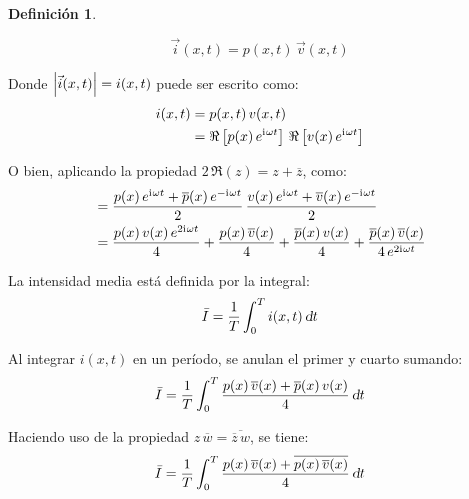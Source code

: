 \documentclass[a5paper,12pt,twoside]{book}
\newtheorem{defn}{{Definición}}[chapter]
\begin{document}

\begin{mdframed}[style=MyFrame1]
    \begin{defn}
    \end{defn}
    \begin{equation*}
        \Vec{i}(x,t) = p(x,t) \, \Vec{v}(x,t)
    \end{equation*}
\end{mdframed}


Donde ${\left| {\Vec{i}(x,t)} \right|}=i(x,t)$ puede ser escrito como:
\begin{align*}
    i(x,t) &= p(x,t) \, v(x,t)
    \\
    &= \Re \left[ p(x) \, e^{\mathrm{i}\mkern1mu \omega t} \right] \, \Re \left[ v(x) \, e^{\mathrm{i}\mkern1mu \omega t} \right]
\end{align*}

O bien, aplicando la propiedad $2\,\Re(z)=z+\overline{z}$, como:
\begin{align*}
    &= \frac{p(x) \, e^{\mathrm{i}\mkern1mu \omega t} + \overline{p}(x) \, e^{-\mathrm{i}\mkern1mu \omega t}}{2} \, \frac{v(x) \, e^{\mathrm{i}\mkern1mu \omega t}+ \overline{v}(x) \, e^{-\mathrm{i}\mkern1mu \omega t}}{2}
    \\
    &= \frac{p(x)\,v(x)\,e^{2\mathrm{i}\mkern1mu\omega t}}{4} 
    + \frac{p(x)\,\overline{v}(x)}{4}
    + \frac{\overline{p}(x)\,v(x)}{4}
    + \frac{\overline{p}(x)\,\overline{v}(x)}{4\,e^{2\mathrm{i}\mkern1mu\omega t}}
\end{align*}

La intensidad media está definida por la integral:
\begin{equation*}
    \bar{I} = \frac{1}{T} \int_0^T i(x,t)\,\textsl{d} t
\end{equation*}

Al integrar $i(x,t)$ en un período, se anulan el primer y cuarto sumando:
\begin{equation*}
    \bar{I} = \frac{1}{T} \int_0^T \frac{p(x)\,\overline{v}(x)+\overline{p}(x)\,v(x)}{4} \,\textsl{d} t
\end{equation*}

Haciendo uso de la propiedad $z\,\overline{w}=\overline{\overline{z}\,w}$, se tiene:
\begin{equation*}
    \bar{I} = \frac{1}{T} \int_0^T \frac{p(x)\,\overline{v}(x)+\overline{p(x)\,\overline{v}(x)}}{4} \,\textsl{d} t
\end{equation*}
\end{document}
